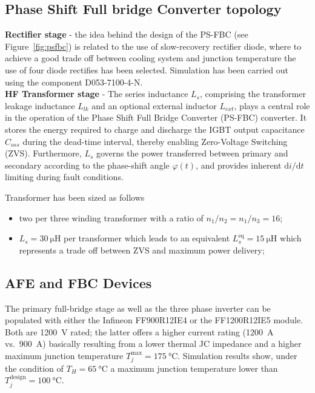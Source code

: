 \documentclass[11pt,a4paper]{scrartcl}
\begin{document}
\begin{onehalfspace}
\subsection{Phase Shift Full bridge Converter topology}

\noindent\textbf{Rectifier stage} - the idea behind the design of the PS-FBC (see Figure~\ref{fig:psfbc}) is related to the use of slow-recovery rectifier diode, where to achieve a good trade off between cooling system and junction temperature the use of four diode rectifies has been selected. Simulation has been carried out using the component D053-7100-4-N. \\

\noindent\textbf{HF Transformer stage} - The series inductance $L_s$, comprising the transformer leakage inductance
$L_{lk}$ and an optional external inductor $L_{ext}$, plays a central role
in the operation of the Phase Shift Full Bridge Converter (PS-FBC) converter.
It stores the energy required to charge and discharge the IGBT output
capacitance $C_{oss}$ during the dead-time interval, thereby enabling
Zero-Voltage Switching (ZVS).
Furthermore, $L_s$ governs the power transferred between primary and
secondary according to the phase-shift angle $\varphi(t)$, and provides
inherent $\mathrm{d}i/\mathrm{d}t$ limiting during fault conditions.

Transformer has been sized as follows
\begin{itemize}
	\item[--] two per three winding transformer with a ratio of $n_1/n_2 = n_1/n_3 = 16$;
	\item[--] $L_s = \SI{30}{\micro\henry}$ per transformer which leads to an equivalent $L_s^\text{eq} = \SI{15}{\micro\henry}$ which represents a trade off between ZVS and maximum power delivery;
\end{itemize}

\subsection{AFE and FBC Devices}
The primary full-bridge stage as well as the three phase inverter can be populated with either the
Infineon FF900R12IE4 or the FF1200R12IE5 module. Both are
\SI{1200}{\volt} rated; the latter offers a higher current rating
(\SI{1200}{\ampere} vs.\ \SI{900}{\ampere}) basically resulting from a lower thermal JC impedance and a higher 
maximum junction temperature $T_j^\text{max} = \SI{175}{\celsius}$. Simulation results show, under the condition of $T_H = \SI{65}{\celsius}$ a maximum junction temperature lower than $T_j^\text{design} = \SI{100}{\celsius}$.


\end{onehalfspace}
\end{document}
